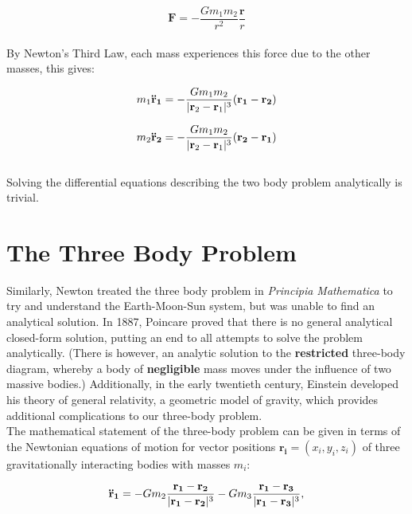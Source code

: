 \documentclass{article}
\begin{document}
\begin{equation}
    \textbf{F} = -\frac{Gm_1m_2}{r^2}\frac{\mathbf{r}}{r}
\end{equation} \\

\noindent By Newton's Third Law, each mass experiences this force due to the other masses, this gives:

\begin{equation}
    m_1\mathbf{\Ddot{r}_1} = -\frac{Gm_1m_2}{\lvert\mathbf{r}_2 - \mathbf{r}_1\rvert^3}(\mathbf{r_1}-\mathbf{r_2})
\end{equation}

\begin{equation}
    m_2\mathbf{\Ddot{r}_2} = -\frac{Gm_1m_2}{\lvert\mathbf{r}_2 - \mathbf{r}_1\rvert^3}(\mathbf{r_2}-\mathbf{r_1})
\end{equation} \\

\noindent Solving the differential equations describing the two body problem analytically is trivial. 

\section{The Three Body Problem}
Similarly, Newton treated the three body problem in \textit{Principia Mathematica} to try and understand the Earth-Moon-Sun system, but was unable to find an analytical solution. In 1887, Poincare proved that there is no general analytical closed-form solution, putting an end to all attempts to solve the problem analytically. (There is however, an analytic solution to the \textbf{restricted} three-body diagram, whereby a body of \textbf{negligible} mass moves under the influence of two massive bodies.) Additionally, in the early twentieth century, Einstein developed his theory of general relativity, a geometric model of gravity, which provides additional complications to our three-body problem. \\

\noindent The mathematical statement of the three-body problem can be given in terms of the Newtonian equations of motion for vector positions $\mathbf{r_i} = (x_i, y_i, z_i)$ of three gravitationally interacting bodies with masses $m_i$:

\begin{equation}
    \mathbf{\Ddot{r}_1} = -Gm_2\frac{\mathbf{r_1}-\mathbf{r_2}}{\lvert\mathbf{r_1}-\mathbf{r_2}\rvert^3} - Gm_3\frac{\mathbf{r_1}-\mathbf{r_3}}{\lvert\mathbf{r_1}-\mathbf{r_3}\rvert^3},
\end{equation}
\end{document}
